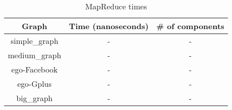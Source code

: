 \begin{table}[h!]
\footnotesize
\begin{center}
\begin{tabular}{|c|c|c|}
\hline
{\bf Graph} & {\bf Time (nanoseconds)}& {\bf \# of components} \\
\hline
\hline
simple\_graph   & -  & -  \\
\hline
medium\_graph   & -  & -   \\
\hline
ego-Facebook   & -  & -  \\
\hline
ego-Gplus   & -  & -\\
\hline
big\_graph   & -  & -  \\
\hline
\end{tabular}
\caption{MapReduce times}
\label{tb:mapreducetimes}
\end{center}
\end{table}
